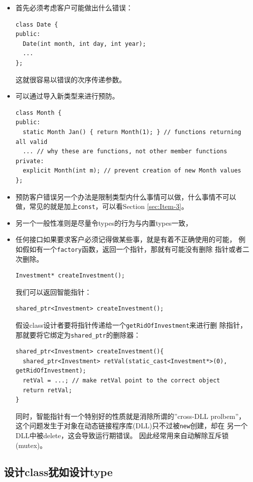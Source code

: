 \begin{itemize}
\item 首先必须考虑客户可能做出什么错误：
\begin{verbatim}
class Date {
public:
  Date(int month, int day, int year);
  ...
};
\end{verbatim}
这就很容易以错误的次序传递参数。
\item 可以通过导入新类型来进行预防。
\begin{verbatim}
class Month {
public:
  static Month Jan() { return Month(1); } // functions returning all valid
  ... // why these are functions, not other member functions
private:
  explicit Month(int m); // prevent creation of new Month values
};
\end{verbatim}
  
\item 预防客户错误另一个办法是限制类型内什么事情可以做，什么事情不可以
  做，常见的就是加上\texttt{const}，可以看Section \ref{sec:Item-3}。
\item 另一个一般性准则是尽量令types的行为与内置types一致，
\item 任何接口如果要求客户必须记得做某些事，就是有着不正确使用的可能，
  例如假如有一个\texttt{factory}函数，返回一个指针，那就有可能没有删除
  指针或者二次删除。
\begin{verbatim}
Investment* createInvestment(); 
\end{verbatim}
  我们可以返回智能指针：
\begin{verbatim}
shared_ptr<Investment> createInvestment();
\end{verbatim}
  假设class设计者要将指针传递给一个\texttt{getRidOfInvestment}来进行删
  除指针，那就要将它绑定为\texttt{shared\_ptr}的删除器：
\begin{verbatim}
shared_ptr<Investment> createInvestment(){
  shared_ptr<Investment> retVal(static_cast<Investment*>(0),
getRidOfInvestment);
  retVal = ...; // make retVal point to the correct object
  return retVal;
}
\end{verbatim}
同时，智能指针有一个特别好的性质就是消除所谓的''cross-DLL prolbem''，
这个问题发生于对象在动态链接程序库(DLL)只不过被\texttt{new}创建，却在
另一个DLL中被delete，这会导致运行期错误。 因此经常用来自动解除互斥锁
(mutex)。
\end{itemize}

\subsection{设计class犹如设计type}
\label{sec:Item-19}


